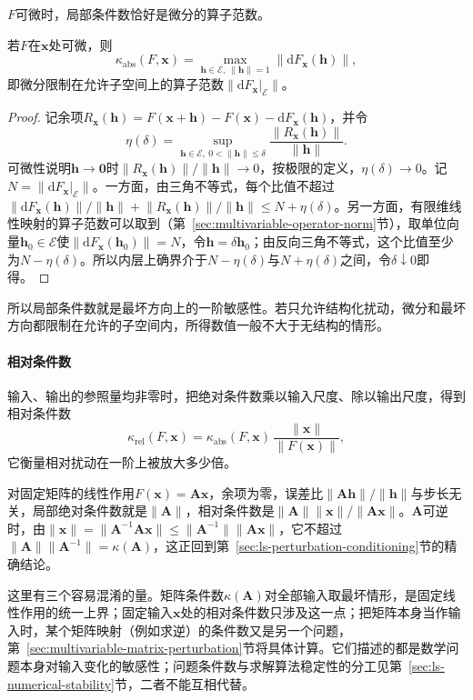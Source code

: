$F$可微时，局部条件数恰好是微分的算子范数。
\begin{theorem}[可微映射的局部条件数]
\label{thm:multivariable-local-condition-number}
若$F$在$\bm x$处可微，则
\[
 \kappa_{\mathrm{abs}}(F,\bm x)=\max_{\bm h\in\mathcal E,\ \lVert\bm h\rVert=1}\lVert\mathrm dF_{\bm x}(\bm h)\rVert,
\]
即微分限制在允许子空间上的算子范数$\lVert\mathrm dF_{\bm x}|_{\mathcal E}\rVert$。
\end{theorem}
\begin{proof}
记余项$R_{\bm x}(\bm h)=F(\bm x+\bm h)-F(\bm x)-\mathrm dF_{\bm x}(\bm h)$，并令
\[
 \eta(\delta)=\sup_{\bm h\in\mathcal E,\ 0<\lVert\bm h\rVert\leq\delta}\frac{\lVert R_{\bm x}(\bm h)\rVert}{\lVert\bm h\rVert}.
\]
可微性说明$\bm h\to\bm0$时$\lVert R_{\bm x}(\bm h)\rVert/\lVert\bm h\rVert\to0$，按极限的定义，$\eta(\delta)\to0$。记$N=\lVert\mathrm dF_{\bm x}|_{\mathcal E}\rVert$。一方面，由三角不等式，每个比值不超过$\lVert\mathrm dF_{\bm x}(\bm h)\rVert/\lVert\bm h\rVert+\lVert R_{\bm x}(\bm h)\rVert/\lVert\bm h\rVert\leq N+\eta(\delta)$。另一方面，有限维线性映射的算子范数可以取到（第~\ref{sec:multivariable-operator-norm}节），取单位向量$\bm h_0\in\mathcal E$使$\lVert\mathrm dF_{\bm x}(\bm h_0)\rVert=N$，令$\bm h=\delta\bm h_0$；由反向三角不等式，这个比值至少为$N-\eta(\delta)$。所以内层上确界介于$N-\eta(\delta)$与$N+\eta(\delta)$之间，令$\delta\downarrow0$即得。
\end{proof}
所以局部条件数就是最坏方向上的一阶敏感性。若只允许结构化扰动，微分和最坏方向都限制在允许的子空间内，所得数值一般不大于无结构的情形。

\paragraph{相对条件数}
输入、输出的参照量均非零时，把绝对条件数乘以输入尺度、除以输出尺度，得到相对条件数
\[
 \kappa_{\mathrm{rel}}(F,\bm x)=\kappa_{\mathrm{abs}}(F,\bm x)\,\frac{\lVert\bm x\rVert}{\lVert F(\bm x)\rVert},
\]
它衡量相对扰动在一阶上被放大多少倍。

对固定矩阵的线性作用$F(\bm x)=\bm A\bm x$，余项为零，误差比$\lVert\bm A\bm h\rVert/\lVert\bm h\rVert$与步长无关，局部绝对条件数就是$\lVert\bm A\rVert$，相对条件数是$\lVert\bm A\rVert\lVert\bm x\rVert/\lVert\bm A\bm x\rVert$。$\bm A$可逆时，由$\lVert\bm x\rVert=\lVert\bm A^{-1}\bm A\bm x\rVert\leq\lVert\bm A^{-1}\rVert\lVert\bm A\bm x\rVert$，它不超过$\lVert\bm A\rVert\lVert\bm A^{-1}\rVert=\kappa(\bm A)$，这正回到第~\ref{sec:ls-perturbation-conditioning}节的精确结论。

这里有三个容易混淆的量。矩阵条件数$\kappa(\bm A)$对全部输入取最坏情形，是固定线性作用的统一上界；固定输入$\bm x$处的相对条件数只涉及这一点；把矩阵本身当作输入时，某个矩阵映射（例如求逆）的条件数又是另一个问题，第~\ref{sec:multivariable-matrix-perturbation}节将具体计算。它们描述的都是数学问题本身对输入变化的敏感性；问题条件数与求解算法稳定性的分工见第~\ref{sec:ls-numerical-stability}节，二者不能互相代替。

